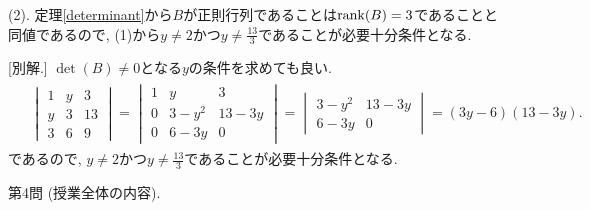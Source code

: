 \documentclass[dvipdfmx,a4paper,11pt]{article}
\theoremstyle{definition}
\begin{document}
(2). 定理\ref{determinant}から$B$が正則行列であることは$\rank(B) = 3$であることと同値であるので, (1)から$y \neq 2$かつ$y \neq \frac{13}{3}$であることが必要十分条件となる.

[別解.] $\det(B) \neq 0$となる$y$の条件を求めても良い.
\begin{align*}
\begin{split}
 & \begin{vmatrix}
1 &y&3 \\
y & 3& 13\\
3&6 &9
 \end{vmatrix} 
= 
 \begin{vmatrix}
1 &y&3 \\
0 & 3 - y^2& 13 - 3y\\
0&6 - 3y &0 
 \end{vmatrix} 
=
 \begin{vmatrix}
3 - y^2& 13 - 3y\\
6 - 3y &0 
 \end{vmatrix} 
 = (3y - 6)(13 - 3y).
 \end{split}
\end{align*}
であるので, $y \neq 2$かつ$y \neq \frac{13}{3}$であることが必要十分条件となる.

\newpage
 
{\Large 第4問}  (授業全体の内容).
 \vspace{11pt}
 
\end{document}
